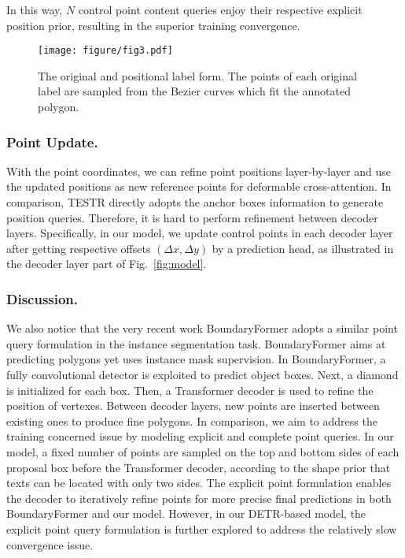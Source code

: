 \documentclass[letterpaper]{article} \usepackage{aaai23}  \usepackage{times}  \usepackage{helvet}  \usepackage{courier}  \usepackage[hyphens]{url}  \usepackage{graphicx} \urlstyle{rm}
\begin{document}
In this way, $N$ control point content queries enjoy their respective explicit position prior, resulting in the superior training convergence.

\begin{figure}[t!]
    \centering
    \texttt{[image: figure/fig3.pdf]}
    \caption{The original and positional label form. The points of each original label are sampled from the Bezier curves \cite{liu2020abcnet} which fit the annotated polygon.}
    \label{fig:ori_pos_label}
\end{figure}


\subsubsection{Point Update.} With the point coordinates, we can refine point positions layer-by-layer and use the updated positions as new reference points for deformable cross-attention. In comparison, TESTR directly adopts the anchor boxes information to generate position queries. Therefore, it is hard to perform refinement between decoder layers. Specifically, in our model, we update control points in each decoder layer after getting respective offsets $(\Delta x, \Delta y)$ by a prediction head, as illustrated in the decoder layer part of Fig.~\ref{fig:model}.

 \subsubsection{Discussion.} We also notice that the very recent work BoundaryFormer \cite{lazarow2022instance} adopts a similar point query formulation in the instance segmentation task. BoundaryFormer aims at predicting polygons yet uses instance mask supervision. In BoundaryFormer, a fully convolutional detector \cite{ren2015faster,tian2019fcos} is exploited to predict object boxes. Next, a diamond is initialized for each box. Then, a Transformer decoder is used to refine the position of vertexes. Between decoder layers, new points are inserted between existing ones to produce fine polygons. In comparison, we aim to address the training concerned issue by modeling explicit and complete point queries. In our model, a fixed number of points are sampled on the top and bottom sides of each proposal box before the Transformer decoder, according to the shape prior that texts can be located with only two sides. The explicit point formulation enables the decoder to iteratively refine points for more precise final predictions in both BoundaryFormer and our model. However, in our DETR-based model, the explicit point query formulation is further explored to address the relatively slow convergence issue.
\end{document}
